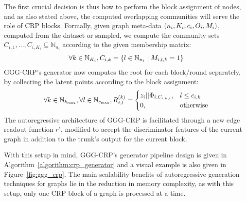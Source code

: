 The first crucial decision is thus how to perform the block assignment of nodes, and as also stated above, the computed overlapping communities will serve the role of CRP blocks. Formally, given graph meta-data $\mathopen{}\left(n_i, K_i, c_i, O_i, M_i\right)$, computed from the dataset or sampled, we compute the community sets $C_{i,1},\dots,C_{i,K_i} \subseteq \mathbb{N}_{n_i}$ according to the given membership matrix: 
\begin{equation}
\forall k \in \mathbb{N}_{K_i},C_{i,k}=\mathopen{}\left\{l \in \mathbb{N}_{n_i} \mid M_{i,l,k} = 1\right\}
\end{equation}
GGG-CRP's generator now computes the root for each block/round separately, by collecting the latent points according to the block assignment:
\begin{equation}
\forall k \in \mathbb{N}_{k_{\max}}, \forall l \in \mathbb{N}_{c_{\max}},
R_{i,l}^{\mathopen{}\left(k\right)} = \begin{cases} z_i||\Phi_{i,C_{i,k,l}}, & l \leq c_{i,k} \\ 0, & \text{otherwise} \end{cases}
\end{equation}
The autoregressive architecture of GGG-CRP is facilitated through a new edge readout function $r'$, modified to accept the discriminator features of the current graph in addition to the trunk's output for the current block. 

With this setup in mind, GGG-CRP's generator pipeline design is given in Algorithm~\ref{algorithm:crp_generator} and a visual example is also given in Figure~\ref{fig:ggg_crp}. The main scalability benefits of autoregressive generation techniques for graphs lie in the reduction in memory complexity, as with this setup, only one CRP block of a graph is processed at a time.

\begin{algorithm}%
\caption{GGG-CRP graph generation}
\label{algorithm:crp_generator}
\begin{algorithmic}
\ENDFOR
{}
\end{algorithmic}
\end{algorithm} 

